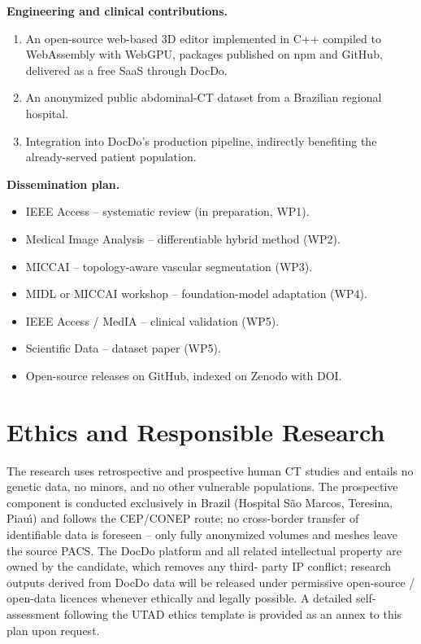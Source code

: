 \documentclass[a4paper,11pt,twoside]{article}
\begin{document}
\textbf{Engineering and clinical contributions.}
\begin{enumerate}[label=(E\arabic*), noitemsep, topsep=3pt]
  \item An open-source web-based 3D editor implemented in C++ compiled to
        WebAssembly with WebGPU, packages published on npm and GitHub,
        delivered as a free SaaS through DocDo.
  \item An anonymized public abdominal-CT dataset from a Brazilian regional
        hospital.
  \item Integration into DocDo's production pipeline, indirectly benefiting
        the already-served patient population.
\end{enumerate}

\textbf{Dissemination plan.}
\begin{itemize}
  \item IEEE Access -- systematic review (in preparation, WP1).
  \item Medical Image Analysis -- differentiable hybrid method (WP2).
  \item MICCAI -- topology-aware vascular segmentation (WP3).
  \item MIDL or MICCAI workshop -- foundation-model adaptation (WP4).
  \item IEEE Access / MedIA -- clinical validation (WP5).
  \item Scientific Data -- dataset paper (WP5).
  \item Open-source releases on GitHub, indexed on Zenodo with DOI.
\end{itemize}

\section{Ethics and Responsible Research}

The research uses retrospective and prospective human CT studies and entails
no genetic data, no minors, and no other vulnerable populations. The
prospective component is conducted exclusively in Brazil (Hospital S\~ao
Marcos, Teresina, Piau\'\i) and follows the CEP/CONEP route; no cross-border
transfer of identifiable data is foreseen -- only fully anonymized volumes
and meshes leave the source PACS. The DocDo platform and all related
intellectual property are owned by the candidate, which removes any third-
party IP conflict; research outputs derived from DocDo data will be released
under permissive open-source / open-data licences whenever ethically and
legally possible. A detailed self-assessment following the UTAD ethics
template is provided as an annex to this plan upon request.
\end{document}
